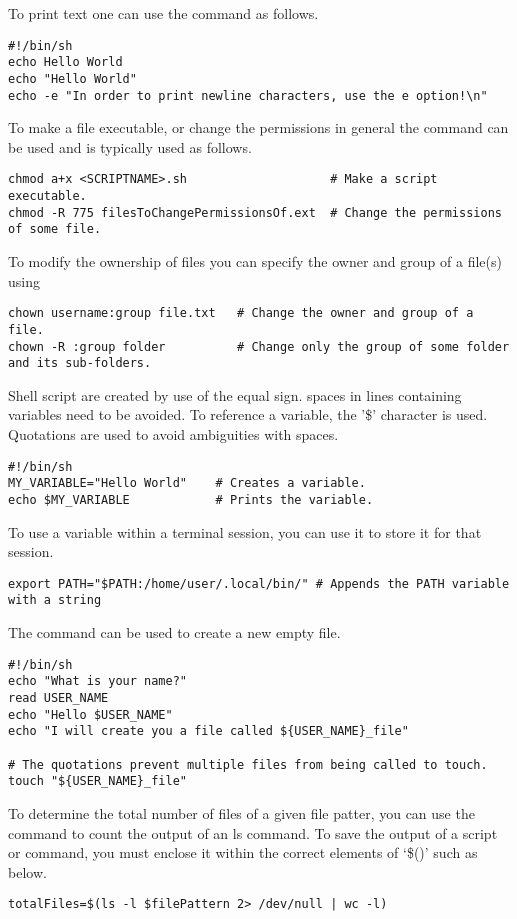To print text one can use the  command as follows.
\begin{lstlisting}
#!/bin/sh
echo Hello World
echo "Hello World"
echo -e "In order to print newline characters, use the e option!\n"
\end{lstlisting}

To make a file executable, or change the permissions in general the  command can be used and is typically used as follows.
\begin{lstlisting}
chmod a+x <SCRIPTNAME>.sh					 # Make a script executable.
chmod -R 775 filesToChangePermissionsOf.ext  # Change the permissions of some file.
\end{lstlisting}

To modify the ownership of files you can specify the owner and group of a file(s) using 
\begin{lstlisting}
chown username:group file.txt   # Change the owner and group of a file.
chown -R :group folder          # Change only the group of some folder and its sub-folders.         
\end{lstlisting}

Shell script  are created by use of the equal sign. spaces in lines containing variables need to be avoided. To reference a variable, the '\$' character is used. Quotations are used to avoid ambiguities with spaces.
\begin{lstlisting}
#!/bin/sh
MY_VARIABLE="Hello World"    # Creates a variable.
echo $MY_VARIABLE            # Prints the variable.
\end{lstlisting}

To use a variable within a terminal session, you can use  it to store it for that session.
\begin{lstlisting}
export PATH="$PATH:/home/user/.local/bin/" # Appends the PATH variable with a string
\end{lstlisting}

The  command can be used to create a new empty file.
\begin{lstlisting}
#!/bin/sh
echo "What is your name?"
read USER_NAME
echo "Hello $USER_NAME"
echo "I will create you a file called ${USER_NAME}_file"

# The quotations prevent multiple files from being called to touch.
touch "${USER_NAME}_file"
\end{lstlisting}

To determine the total number of files of a given file patter, you can use the  command to count the output of an ls command. To save the output of a script or command, you must enclose it within the correct elements of `\$()' such as below.
\begin{lstlisting}
totalFiles=$(ls -l $filePattern 2> /dev/null | wc -l)
\end{lstlisting}


